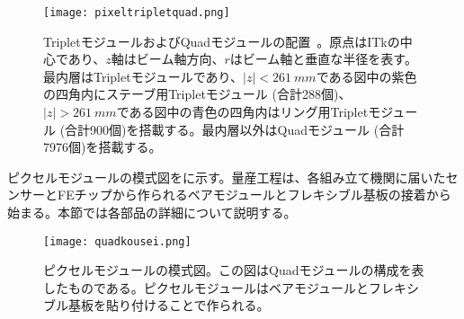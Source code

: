 \begin{figure}[tbp]
  \centering
  \texttt{[image: pixeltripletquad.png]}
  \caption[TripletモジュールおよびQuadモジュールの配置]{TripletモジュールおよびQuadモジュールの配置\ \cite{itkpixellayoutupdate}。原点はITkの中心であり、$z$軸はビーム軸方向、$r$はビーム軸と垂直な半径を表す。最内層はTripletモジュールであり、$|z|<261\ \si{mm}$である図中の紫色の四角内にステーブ用Tripletモジュール (合計288個)、$|z|>261\ \si{mm}$である図中の青色の四角内はリング用Tripletモジュール (合計900個)を搭載する。最内層以外はQuadモジュール (合計7976個)を搭載する。}
  \label{fig:itkpixelhaiti}
\end{figure}




ピクセルモジュールの模式図をに示す。量産工程は、各組み立て機関に届いたセンサーとFEチップから作られるベアモジュールとフレキシブル基板の接着から始まる。本節では各部品の詳細について説明する。


\begin{figure}[tbp]
  \centering
  \texttt{[image: quadkousei.png]}
  \caption[ピクセルモジュールの模式図]{ピクセルモジュールの模式図。この図はQuadモジュールの構成を表したものである。ピクセルモジュールはベアモジュールとフレキシブル基板を貼り付けることで作られる。}
  \label{fig:quadkousei}
\end{figure}


